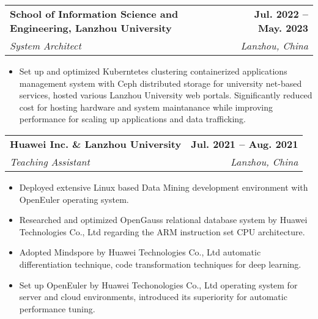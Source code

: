 \documentclass[letterpaper,11pt]{article}
\makeatletter
\newcommand{\resumeItem}[1]{
  \item\small{
    {#1 \vspace{-2pt}}
  }
}
\newcommand{\resumeSubheading}[4]{
  \vspace{-2pt}\item
    \begin{tabular*}{1.0\textwidth}[t]{l@{\extracolsep{\fill}}r}
      \textbf{#1} & \textbf{\small #2} \\
      \textit{\small#3} & \textit{\small #4} \\
    \end{tabular*}\vspace{-7pt}
}
\newcommand{\resumeItemListStart}{\begin{itemize}}
\newcommand{\resumeItemListEnd}{\end{itemize}\vspace{-5pt}}
\makeatother
\begin{document}
    
    \resumeSubheading
    {School of Information Science and Engineering, Lanzhou University}{Jul. 2022 -- May. 2023}
    {System Architect}{Lanzhou, China}
    \resumeItemListStart
    \resumeItem{Set up and optimized Kuberntetes clustering containerized applications management system with Ceph distributed storage for university net-based services, hosted various Lanzhou University web portals. Significantly reduced cost for hosting hardware and system maintanance while improving performance for scaling up applications and data trafficking.}
    \resumeItemListEnd
    \resumeSubheading
      {Huawei Inc. \& Lanzhou University}{Jul. 2021 -- Aug. 2021}
      {Teaching Assistant}{Lanzhou, China}
      \resumeItemListStart
        \resumeItem{Deployed extensive Linux based Data Mining development environment with OpenEuler\textsuperscript{\tiny\textregistered} operating system.}
        \resumeItem{Researched and optimized OpenGauss\textsuperscript{\tiny\textregistered} relational database system by Huawei Technologies Co., Ltd regarding the ARM instruction set CPU architecture.} 
        \resumeItem{Adopted Mindspore\textsuperscript{\tiny\textregistered} by Huawei Technologies Co., Ltd automatic differentiation technique, code transformation techniques for deep learning. }
        \resumeItem{Set up OpenEuler\textsuperscript{\tiny\textregistered} by Huawei Techonologies Co., Ltd operating system for server and cloud environments, introduced its superiority for automatic performance tuning. }
      \resumeItemListEnd
    
\end{document}

